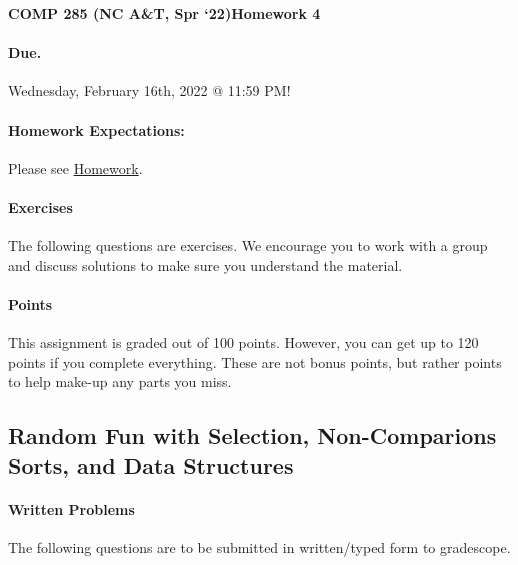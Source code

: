 \documentclass [12pt]{article}
\begin{document}
 

{\LARGE \textbf {COMP 285 (NC A\&T, Spr `22)}\hfill \textbf {Homework 4} } 
\vspace {1em} 
\begin {Instruction} 

\paragraph {Due.} Wednesday, February 16th, 2022 @ 11:59 PM!
\end {Instruction} 

\vspace {1em} 
\begin {Instruction} \paragraph {Homework Expectations:} Please see \href{https://www.comp285.ml/homework/#general-homework-information}{Homework}.
\end {Instruction}

\vspace {1em} 
\begin {Instruction} 

\paragraph {Exercises} The following questions are exercises. We encourage you to work with a group and discuss solutions to make sure you understand the material.

\paragraph {Points} This assignment is graded out of 100 points. However, you can get up to 120 points if you complete everything. These are not bonus points, but rather points to help make-up any parts you miss.

\end {Instruction} 

\begin{centering}
\section*{Random Fun with Selection, Non-Comparions Sorts, and Data Structures}
\end{centering}

\begin{Instruction}

\paragraph{Written Problems} The following questions are to be submitted in written/typed form to gradescope.

\end{Instruction}
\end{document}
